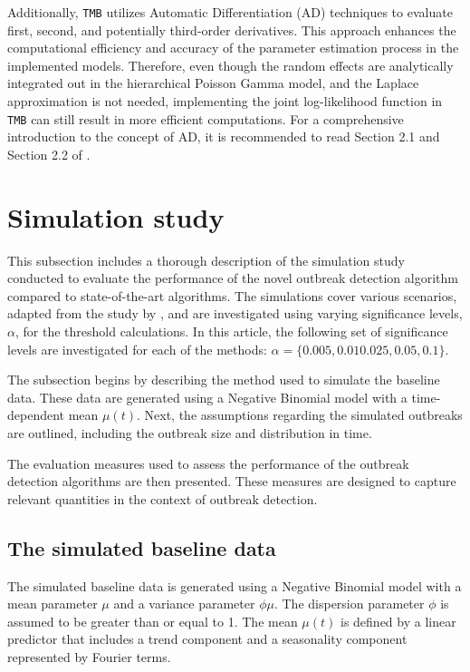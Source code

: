 \documentclass[preprint, 3p, authoryear]{elsarticle} %
\begin{document}
Additionally, \texttt{TMB} utilizes Automatic Differentiation (AD) techniques \citep{Griewank_2008} to evaluate first, second, and potentially third-order derivatives. This approach enhances the computational efficiency and accuracy of the parameter estimation process in the implemented models. Therefore, even though the random effects are analytically integrated out in the hierarchical Poisson Gamma model, and the Laplace approximation is not needed, implementing the joint log-likelihood function in \texttt{TMB} can still result in more efficient computations. For a comprehensive introduction to the concept of AD, it is recommended to read Section 2.1 and Section 2.2 of \citet{Fournier_2012}.

\hypertarget{simulation-study}{%
\section{Simulation study}\label{simulation-study}}

This subsection includes a thorough description of the simulation study conducted to evaluate the performance of the novel outbreak detection algorithm compared to state-of-the-art algorithms. The simulations cover various scenarios, adapted from the study by \citet{Noufaily_2013}, and are investigated using varying significance levels, \(\alpha\), for the threshold calculations. In this article, the following set of significance levels are investigated for each of the methods: \(\alpha=\{0.005, 0.01 0.025, 0.05, 0.1\}\).

The subsection begins by describing the method used to simulate the baseline data. These data are generated using a Negative Binomial model with a time-dependent mean \(\mu(t)\). Next, the assumptions regarding the simulated outbreaks are outlined, including the outbreak size and distribution in time.

The evaluation measures used to assess the performance of the outbreak detection algorithms are then presented. These measures are designed to capture relevant quantities in the context of outbreak detection.

\hypertarget{the-simulated-baseline-data}{%
\subsection{The simulated baseline data}\label{the-simulated-baseline-data}}

The simulated baseline data is generated using a Negative Binomial model with a mean parameter \(\mu\) and a variance parameter \(\phi\mu\). The dispersion parameter \(\phi\) is assumed to be greater than or equal to 1. The mean \(\mu(t)\) is defined by a linear predictor that includes a trend component and a seasonality component represented by Fourier terms.
\end{document}
